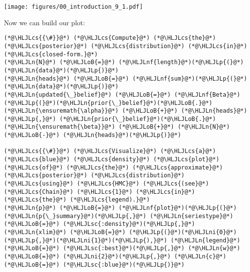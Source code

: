 \documentclass[12pt,a4paper]{article}
\newcommand{\HLJLn}[1]{#1}
\newcommand{\HLJLnf}[1]{\textcolor[RGB]{66,102,213}{#1}}
\newcommand{\HLJLsc}[1]{\textcolor[RGB]{201,61,57}{#1}}
\newcommand{\HLJLni}[1]{\textcolor[RGB]{59,151,46}{#1}}
\newcommand{\HLJLoB}[1]{\textcolor[RGB]{102,102,102}{\textbf{#1}}}
\newcommand{\HLJLp}[1]{#1}
\newcommand{\HLJLcs}[1]{\textcolor[RGB]{153,153,119}{\textit{#1}}}
\begin{document}
\texttt{[image: figures/00\_introduction\_9\_1.pdf]}

Now we can build our plot:


\begin{lstlisting}
(*@\HLJLcs{{\#}}@*) (*@\HLJLcs{Compute}@*) (*@\HLJLcs{the}@*) (*@\HLJLcs{posterior}@*) (*@\HLJLcs{distribution}@*) (*@\HLJLcs{in}@*) (*@\HLJLcs{closed-form.}@*)
(*@\HLJLn{N}@*) (*@\HLJLoB{=}@*) (*@\HLJLnf{length}@*)(*@\HLJLp{(}@*)(*@\HLJLn{data}@*)(*@\HLJLp{)}@*)
(*@\HLJLn{heads}@*) (*@\HLJLoB{=}@*) (*@\HLJLnf{sum}@*)(*@\HLJLp{(}@*)(*@\HLJLn{data}@*)(*@\HLJLp{)}@*)
(*@\HLJLn{updated{\_}belief}@*) (*@\HLJLoB{=}@*) (*@\HLJLnf{Beta}@*)(*@\HLJLp{(}@*)(*@\HLJLn{prior{\_}belief}@*)(*@\HLJLoB{.}@*)(*@\HLJLn{\ensuremath{\alpha}}@*) (*@\HLJLoB{+}@*) (*@\HLJLn{heads}@*)(*@\HLJLp{,}@*) (*@\HLJLn{prior{\_}belief}@*)(*@\HLJLoB{.}@*)(*@\HLJLn{\ensuremath{\beta}}@*) (*@\HLJLoB{+}@*) (*@\HLJLn{N}@*) (*@\HLJLoB{-}@*) (*@\HLJLn{heads}@*)(*@\HLJLp{)}@*)

(*@\HLJLcs{{\#}}@*) (*@\HLJLcs{Visualize}@*) (*@\HLJLcs{a}@*) (*@\HLJLcs{blue}@*) (*@\HLJLcs{density}@*) (*@\HLJLcs{plot}@*) (*@\HLJLcs{of}@*) (*@\HLJLcs{the}@*) (*@\HLJLcs{approximate}@*) (*@\HLJLcs{posterior}@*) (*@\HLJLcs{distribution}@*) (*@\HLJLcs{using}@*) (*@\HLJLcs{HMC}@*) (*@\HLJLcs{(see}@*) (*@\HLJLcs{Chain}@*) (*@\HLJLcs{1}@*) (*@\HLJLcs{in}@*) (*@\HLJLcs{the}@*) (*@\HLJLcs{legend).}@*)
(*@\HLJLn{p}@*) (*@\HLJLoB{=}@*) (*@\HLJLnf{plot}@*)(*@\HLJLp{(}@*)(*@\HLJLn{p{\_}summary}@*)(*@\HLJLp{,}@*) (*@\HLJLn{seriestype}@*) (*@\HLJLoB{=}@*) (*@\HLJLsc{:density}@*)(*@\HLJLp{,}@*) (*@\HLJLn{xlim}@*) (*@\HLJLoB{=}@*) (*@\HLJLp{(}@*)(*@\HLJLni{0}@*)(*@\HLJLp{,}@*)(*@\HLJLni{1}@*)(*@\HLJLp{),}@*) (*@\HLJLn{legend}@*) (*@\HLJLoB{=}@*) (*@\HLJLsc{:best}@*)(*@\HLJLp{,}@*) (*@\HLJLn{w}@*) (*@\HLJLoB{=}@*) (*@\HLJLni{2}@*)(*@\HLJLp{,}@*) (*@\HLJLn{c}@*) (*@\HLJLoB{=}@*) (*@\HLJLsc{:blue}@*)(*@\HLJLp{)}@*)


\end{lstlisting}
\end{document}
